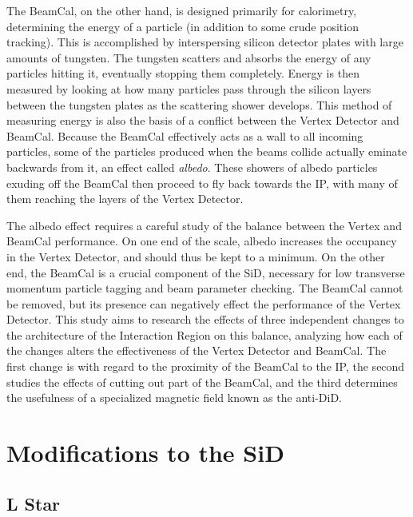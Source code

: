 \documentclass{report}
\begin{document}
                The BeamCal, on the other hand, is designed primarily for calorimetry, determining the energy of a particle (in addition to some crude position tracking). This is accomplished by interspersing silicon detector plates with large amounts of tungsten. The tungsten scatters and absorbs the energy of any particles hitting it, eventually stopping them completely. Energy is then measured by looking at how many particles pass through the silicon layers between the tungsten plates as the scattering shower develops. This method of measuring energy is also the basis of a conflict between the Vertex Detector and BeamCal. Because the BeamCal effectively acts as a wall to all incoming particles, some of the particles produced when the beams collide actually eminate backwards from it, an effect called \textit{albedo}. These showers of albedo particles exuding off the BeamCal then proceed to fly back towards the IP, with many of them reaching the layers of the Vertex Detector.
                
                The albedo effect requires a careful study of the balance between the Vertex and BeamCal performance. On one end of the scale, albedo increases the occupancy in the Vertex Detector, and should thus be kept to a minimum. On the other end, the BeamCal is a crucial component of the SiD, necessary for low transverse momentum particle tagging and beam parameter checking. The BeamCal cannot be removed, but its presence can negatively effect the performance of the Vertex Detector. This study aims to research the effects of three independent changes to the architecture of the Interaction Region on this balance, analyzing how each of the changes alters the effectiveness of the Vertex Detector and BeamCal. The first change is with regard to the proximity of the BeamCal to the IP, the second studies the effects of cutting out part of the BeamCal, and the third determines the usefulness of a specialized magnetic field known as the anti-DiD.



        \section{Modifications to the SiD} \label{sect__sid_mods}
            \subsection{L Star}
\end{document}
